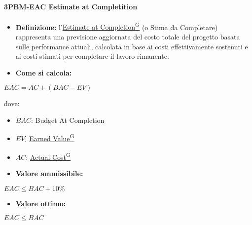 \paragraph*{3PBM-EAC Estimate at Completition}
\begin{itemize}
    \item \textbf{Definizione:} l’\href{https://code7crusaders.github.io/docs/PB/documentazione_interna/glossario.html#estimate-at-completion}{Estimate at Completion\textsuperscript{G}} (o Stima da Completare) rappresenta una previsione aggiornata del costo totale del progetto basata sulle performance attuali, calcolata in base ai costi effettivamente sostenuti e ai costi stimati per completare il lavoro rimanente.
    \item \textbf{Come si calcola:}
\end{itemize}
\begin{center}
   $EAC = AC + (BAC - EV)$ 
\end{center}
dove:
\begin{itemize}[label=$\rightarrow$]
    \item $BAC$: Budget At Completion
    \item $EV$: \href{https://code7crusaders.github.io/docs/PB/documentazione_interna/glossario.html#earned-value}{Earned Value\textsuperscript{G}}
    \item $AC$: \href{https://code7crusaders.github.io/docs/PB/documentazione_interna/glossario.html#actual-cost}{Actual Cost\textsuperscript{G}}
\end{itemize}
\begin{itemize}
    \item \textbf{Valore ammissibile:}
\end{itemize}
\begin{center}
    $EAC \leq BAC + 10\%$
\end{center}
\begin{itemize}
    \item \textbf{Valore ottimo:}
\end{itemize}
\begin{center}
    $EAC \leq BAC$
\end{center}

